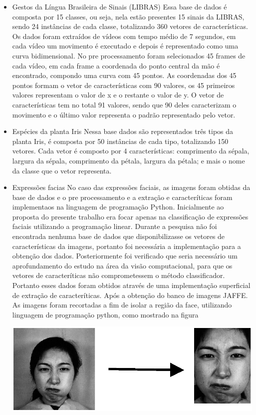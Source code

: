 \begin{itemize}
\item{Gestos da Língua Brasileira de Sinais (LIBRAS) \cite{Libras}}
Essa base de dados é composta por 15 classes, ou seja, nela estão presentes 15 sinais da LIBRAS, sendo 24 instâncias de cada classe, totalizando 360 vetores de características. Os dados foram extraídos de vídeos com tempo médio de 7 segundos, em cada vídeo um movimento é executado e depois é representado como uma curva bidimensional. No pre processamento foram selecionados 45 frames de cada vídeo, em cada frame a coordenada do ponto central da mão é encontrado, compondo uma curva com 45 pontos. As coordenadas dos 45 pontos formam o vetor de características com 90 valores, os 45 primeiros valores representam o valor de x e o restante o valor de y.
O vetor de características tem no total 91 valores, sendo que 90 deles caracterizam o movimento e o último valor representa o padrão representado pelo vetor.

\item{Espécies da planta Iris \cite{Iris}}
Nessa base dados são representados três tipos da planta Iris, é composta por 50 instâncias de cada tipo, totalizando 150 vetores. Cada vetor é composto por 4 características: comprimento da sépala, largura da sépala, comprimento da pétala, largura da pétala; e mais o nome da classe que o vetor representa.

\item{Expressões facias}
No caso das expressões faciais, as imagens foram obtidas da base de dados  e o pre processamento e a extração e caracteríticas foram implementaos na linguagem de programação Python.
Inicialmente ao proposta do presente trabalho era focar apenas na classificação de expressões faciais utilizando a programação linear. Durante a pesquisa não foi encontrada nenhuma base de dados que disponibilizasse os vetores de características da imagens, portanto foi necessária a implementação para a obtenção dos dados. Posteriormente foi verificado que seria necessário um aprofundamento do estudo na área da visão computacional, para que os vetores de caracteríticas não comprometessem o método classificador. Portanto esses dados foram obtidos através de uma implementação superficial de extração de caracteríticas.
Após a obtenção do banco de imagens JAFFE. As imagens foram recortadas a fim de isolar a região da face, utilizando linguagem de programação python, como mostrado na figura

\begin{center}
	\includegraphics[scale=0.5]{graficos/jaffe}
	\label{img:jaffe}
\end{center}


\end{itemize}
